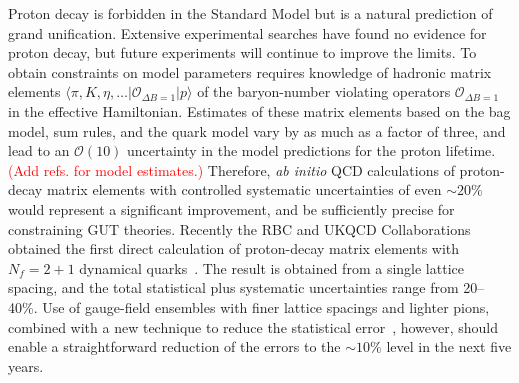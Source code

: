 \begin{itemize}
Proton decay is forbidden in the Standard Model but is a natural prediction of grand unification.
Extensive experimental searches have found no evidence for proton decay, but future experiments
will continue to improve the limits.
To obtain constraints on model parameters requires knowledge of hadronic matrix elements
$\langle\pi,K,\eta,\ldots|\mathcal{O}_{\Delta B=1} | p \rangle$ of the baryon-number violating operators
$\mathcal{O}_{\Delta B=1}$ in the effective Hamiltonian.
Estimates of these matrix elements based on the bag model, sum rules, and the quark model vary by as much as a factor of three, and lead to an ${\mathcal O}(10)$ uncertainty in the model predictions for the proton
lifetime.  \textcolor{red}{(Add refs. for model estimates.)} Therefore, \emph{ab initio} QCD calculations of proton-decay matrix elements with controlled systematic
uncertainties of even $\sim 20\%$ would represent a significant improvement, and be sufficiently precise for
constraining GUT theories. Recently the RBC and UKQCD Collaborations obtained the first direct calculation of proton-decay matrix
elements with $N_f=2+1$ dynamical quarks~\cite{Aoki:2013yxa}.
The result is obtained from a single lattice spacing, and the total statistical plus systematic uncertainties
range from 20--40\%.
Use of gauge-field ensembles with finer lattice spacings and lighter pions, combined with a new technique to
reduce the statistical error~\cite{Blum:2012uh}, however, should enable a straightforward reduction of the
errors to the $\sim 10\%$ level in the next five years.


\end{itemize}
